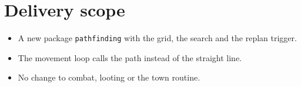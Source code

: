 \section{Delivery scope}
\begin{itemize}
\item A new package \verb|pathfinding| with the grid, the search and the replan trigger.
\item The movement loop calls the path instead of the straight line.
\item No change to combat, looting or the town routine.
\end{itemize}
